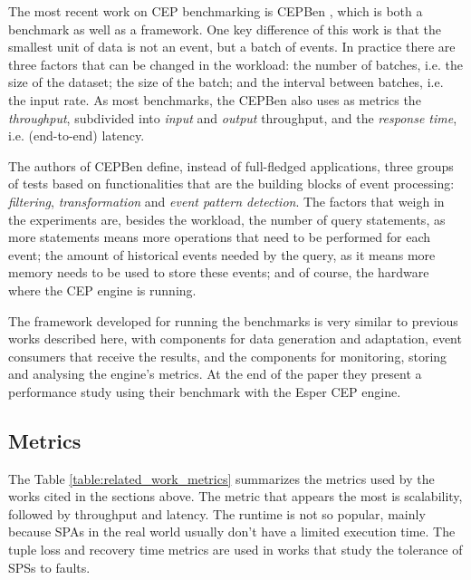 \documentclass[ppgc,diss,english]{iiufrgs}
\begin{document}

The most recent work on CEP benchmarking is CEPBen \cite{li2014cepben}, which is both a benchmark as well as a framework. One key difference of this work is that the smallest unit of data is not an event, but a batch of events. In practice there are three factors that can be changed in the workload: the number of batches, i.e. the size of the dataset; the size of the batch; and the interval between batches, i.e. the input rate. As most benchmarks, the CEPBen also uses as metrics the \emph{throughput}, subdivided into \emph{input} and \emph{output} throughput, and the \emph{response time}, i.e. (end-to-end) latency.

The authors of CEPBen define, instead of full-fledged applications, three groups of tests based on functionalities that are the building blocks of event processing: \emph{filtering}, \emph{transformation} and \emph{event pattern detection}. The factors that weigh in the experiments are, besides the workload, the number of query statements, as more statements means more operations that need to be performed for each event; the amount of historical events needed by the query, as it means more memory needs to be used to store these events; and of course, the hardware where the CEP engine is running.

The framework developed for running the benchmarks is very similar to previous works described here, with components for data generation and adaptation, event consumers that receive the results, and the components for monitoring, storing and analysing the engine's metrics. At the end of the paper they present a performance study using their benchmark with the Esper CEP engine.

\subsection{Metrics}
\label{subsec:esp:metrics}

The Table \ref{table:related_work_metrics} summarizes the metrics used by the works cited in the sections above. The metric that appears the most is scalability, followed by throughput and latency. The runtime is not so popular, mainly because SPAs in the real world usually don't have a limited execution time. The tuple loss and recovery time metrics are used in works that study the tolerance of SPSs to faults.
\end{document}
